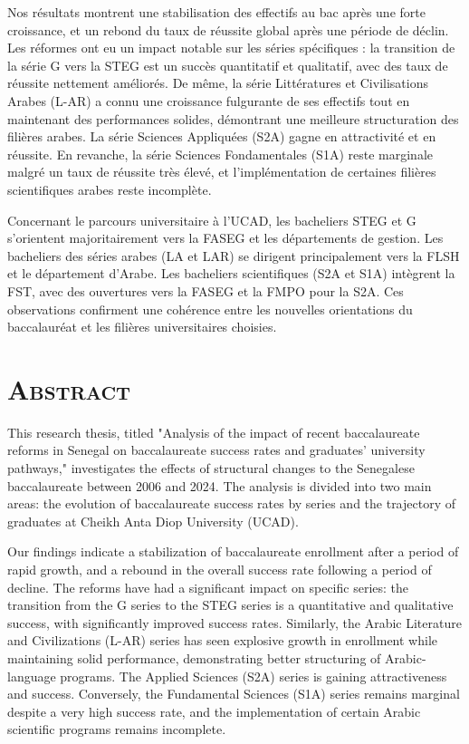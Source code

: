 \documentclass[a4paper,12pt]{report}                %
\begin{document}
    Nos résultats montrent une stabilisation des effectifs au bac après une forte croissance, et un rebond du taux de réussite global après une période de déclin. 
    Les réformes ont eu un impact notable sur les séries spécifiques : la transition de la série G vers la STEG est un succès quantitatif et qualitatif, avec des taux de réussite nettement améliorés. 
    De même, la série Littératures et Civilisations Arabes (L-AR) a connu une croissance fulgurante de ses effectifs tout en maintenant des performances solides, démontrant une meilleure structuration des filières arabes. 
    La série Sciences Appliquées (S2A) gagne en attractivité et en réussite. 
    En revanche, la série Sciences Fondamentales (S1A) reste marginale malgré un taux de réussite très élevé, et l'implémentation de certaines filières scientifiques arabes reste incomplète.
    
    Concernant le parcours universitaire à l'UCAD, les bacheliers STEG et G s'orientent majoritairement vers la FASEG et les départements de gestion. 
    Les bacheliers des séries arabes (LA et LAR) se dirigent principalement vers la FLSH et le département d'Arabe. Les bacheliers scientifiques (S2A et S1A) intègrent la FST, avec des ouvertures vers la FASEG et la FMPO pour la S2A. 
    Ces observations confirment une cohérence entre les nouvelles orientations du baccalauréat et les filières universitaires choisies.

    \newpage
    \section*{\textsc{Abstract}}

    This research thesis, titled "Analysis of the impact of recent baccalaureate reforms in Senegal on baccalaureate success rates and graduates' university pathways," investigates the effects of structural changes to the Senegalese baccalaureate between 2006 and 2024. 
    The analysis is divided into two main areas: the evolution of baccalaureate success rates by series and the trajectory of graduates at Cheikh Anta Diop University (UCAD).
    
    Our findings indicate a stabilization of baccalaureate enrollment after a period of rapid growth, and a rebound in the overall success rate following a period of decline. 
    The reforms have had a significant impact on specific series: the transition from the G series to the STEG series is a quantitative and qualitative success, with significantly improved success rates. Similarly, the Arabic Literature and Civilizations (L-AR) series has seen explosive growth in enrollment while maintaining solid performance, demonstrating better structuring of Arabic-language programs. 
    The Applied Sciences (S2A) series is gaining attractiveness and success. 
    Conversely, the Fundamental Sciences (S1A) series remains marginal despite a very high success rate, and the implementation of certain Arabic scientific programs remains incomplete.
\end{document}
